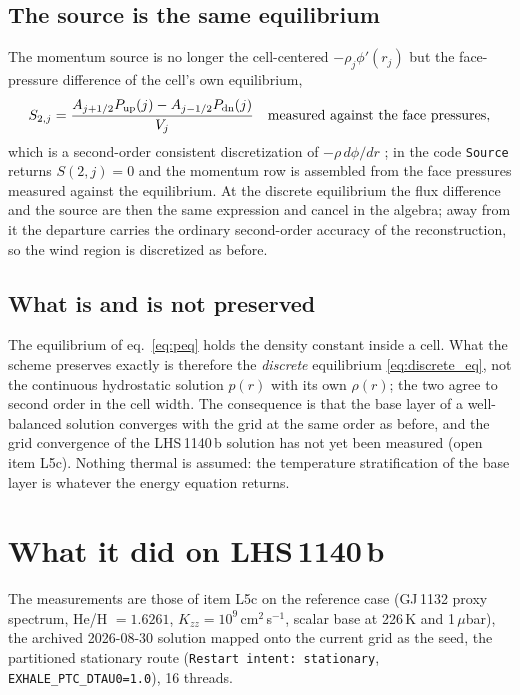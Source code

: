 \documentclass[english,a4paper]{my_memo}
\begin{document}
\subsection{The source is the same equilibrium}

The momentum source is no longer the cell-centered $-\rho_j\phi'(r_j)$ but
the face-pressure difference of the cell's own equilibrium,
\begin{equation}
  S_{2,j} = \frac{A_{j+1/2}P_{\rm up}(j) - A_{j-1/2}P_{\rm dn}(j)}{V_j}
  \quad\text{measured against the face pressures},
\end{equation}
which is a second-order consistent discretization of $-\rho\,d\phi/dr$
\citep[theorem 1]{Kappeli2014}; in the code \texttt{Source} returns
$S(2,j) = 0$ and the momentum row is assembled from the face pressures
measured against the equilibrium. At the discrete equilibrium the flux
difference and the source are then the same expression and cancel in the
algebra; away from it the departure carries the ordinary second-order
accuracy of the reconstruction, so the wind region is discretized as before.

\subsection{What is and is not preserved}

The equilibrium of eq.\ \eqref{eq:peq} holds the density constant inside a
cell. What the scheme preserves exactly is therefore the \emph{discrete}
equilibrium \eqref{eq:discrete_eq}, not the continuous hydrostatic solution
$p(r)$ with its own $\rho(r)$; the two agree to second order in the cell width.
The consequence is that the base layer of a well-balanced solution converges
with the grid at the same order as before, and the grid convergence of the
LHS\,1140\,b solution has not yet been measured (open item L5c). Nothing thermal
is assumed: the temperature stratification of the base layer is whatever the
energy equation returns.

\section{What it did on LHS\,1140\,b}

The measurements are those of item L5c on the reference case
(GJ\,1132 proxy spectrum, He/H $= 1.6261$, $K_{zz} = 10^{9}$\,cm$^2$\,s$^{-1}$,
scalar base at 226\,K and 1\,$\mu$bar), the archived 2026-08-30 solution
mapped onto the current grid as the seed, the partitioned stationary route
(\texttt{Restart intent:\ stationary}, \texttt{EXHALE\_PTC\_DTAU0=1.0}),
16 threads.
\end{document}
